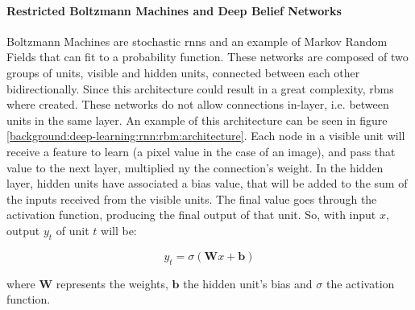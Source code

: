 \documentclass[
  twoside,
  11pt, a4paper,
  footinclude=true,
  headinclude=true,
  cleardoublepage=empty
]{scrbook}
\begin{document}
        \paragraph{Restricted Boltzmann Machines and Deep Belief Networks}
          Boltzmann Machines are stochastic \glspl{rnn} and an example of Markov Random Fields \cite{rozanov1982markov} that can fit to a probability function. These networks are composed of two groups of units, visible and hidden units, connected between each other bidirectionally. Since this architecture could result in a great complexity, \glspl{rbm} where created. These networks do not allow connections in-layer, i.e. between units in the same layer. An example of this architecture can be seen in figure \ref{background:deep-learning:rnn:rbm:architecture}. Each node in a visible unit will receive a feature to learn (a pixel value in the case of an image), and pass that value to the next layer, multiplied ny the connection's weight. In the hidden layer, hidden units have associated a bias value, that will be added to the sum of the inputs received from the visible units. The final value goes through the activation function, producing the final output of that unit. So, with input $x$, output $y_t$ of unit $t$ will be:

          \begin{equation}
            y_t = \sigma(\boldsymbol{W} x + \boldsymbol{b})
          \end{equation}

          where $\boldsymbol{W}$ represents the weights, $\boldsymbol{b}$ the hidden unit's bias and $\sigma$ the activation function.

\end{document}
